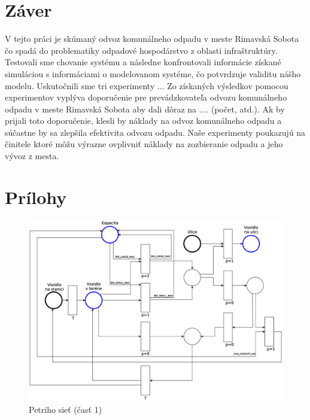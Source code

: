\documentclass[11pt,a4paper]{article}
\begin{document}
\section{Záver}

    \indent V tejto práci je skúmaný odvoz komunálneho odpadu v meste Rimavská Sobota čo spadá do problematiky odpadové hospodárstvo z oblasti infraštruktúry. Testovali sme chovanie systému a následne konfrontovali informácie získané simuláciou s informáciami o modelovanom systéme, čo potvrdzuje validitu nášho modelu. Uskutočnili sme tri experimenty ... Zo získaných výsledkov pomocou experimentov vyplýva doporučenie pre prevádzkovateľa odvozu komunálneho odpadu v meste Rimavská Sobota aby dali dôraz na .... (počet, atd.). Ak by prijali toto doporučenie, klesli by náklady na odvoz komunálneho odpadu a súčastne by sa zlepšila efektivita odvozu odpadu. Naše experimenty poukazujú na činitele ktoré môžu výrazne ovplivniť náklady na zozbieranie odpadu a jeho vývoz z mesta.

\newpage
\section{Prílohy}

\begin{figure}[h]
    \center
    \includegraphics[scale=0.35]{../pn/pn-part1.eps}
    \caption{Petriho sieť (časť 1)}
    \label{PN-P1}
\end{figure}
\end{document}
